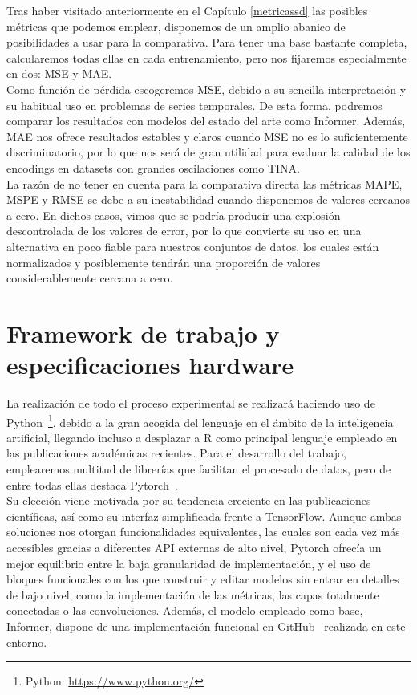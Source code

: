 Tras haber visitado anteriormente en el Capítulo \ref{metricassd} las posibles métricas que podemos emplear, disponemos de un amplio abanico de posibilidades a usar para la comparativa. Para tener una base bastante completa, calcularemos todas ellas en cada entrenamiento, pero nos fijaremos especialmente en dos: MSE y MAE.\\

Como función de pérdida escogeremos MSE, debido a su sencilla interpretación y su habitual uso en problemas de series temporales. De esta forma, podremos comparar los resultados con modelos del estado del arte como Informer. Además, MAE nos ofrece resultados estables y claros cuando MSE no es lo suficientemente discriminatorio, por lo que nos será de gran utilidad para evaluar la calidad de los encodings en datasets con grandes oscilaciones como TINA.\\

La razón de no tener en cuenta para la comparativa directa las métricas MAPE, MSPE y RMSE se debe a su inestabilidad cuando disponemos de valores cercanos a cero. En dichos casos, vimos que se podría producir una explosión descontrolada de los valores de error, por lo que convierte su uso en una alternativa en poco fiable para nuestros conjuntos de datos, los cuales están normalizados y posiblemente tendrán una proporción de valores considerablemente cercana a cero.

\section{Framework de trabajo y especificaciones hardware}

La realización de todo el proceso experimental se realizará haciendo uso de Python~\footnote{Python: \url{https://www.python.org/}}, debido a la gran acogida del lenguaje en el ámbito de la inteligencia artificial, llegando incluso a desplazar a R como principal lenguaje empleado en las publicaciones académicas recientes. Para el desarrollo del trabajo, emplearemos multitud de librerías que facilitan el procesado de datos, pero de entre todas ellas destaca Pytorch~\cite{paszke2019pytorchimperativestylehighperformance}.\\

Su elección viene motivada por su tendencia creciente en las publicaciones científicas, así como su interfaz simplificada frente a TensorFlow. Aunque ambas soluciones nos otorgan funcionalidades equivalentes, las cuales son cada vez más accesibles gracias a diferentes API externas de alto nivel, Pytorch ofrecía un mejor equilibrio entre la baja granularidad de implementación, y el uso de bloques funcionales con los que construir y editar modelos sin entrar en detalles de bajo nivel, como la implementación de las métricas, las capas totalmente conectadas o las convoluciones. Además, el modelo empleado como base, Informer, dispone de una implementación funcional en GitHub~\cite{zhouhaoyi2020informer} realizada en este entorno.\\

